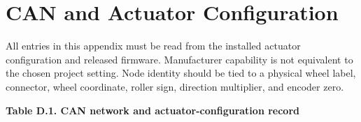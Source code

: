 \chapter{CAN and Actuator Configuration}\label{ch:can-and-actuator-configuration}

All entries in this appendix must be read from the installed actuator
configuration and released firmware. Manufacturer capability is not
equivalent to the chosen project setting. Node identity should be tied
to a physical wheel label, connector, wheel coordinate, roller sign,
direction multiplier, and encoder zero.

\clearpage
\begin{landscape}
\par\medskip\noindent\singlespacing
{}
\textbf{Table D.1. CAN network and actuator-configuration record}\par


\end{landscape}
